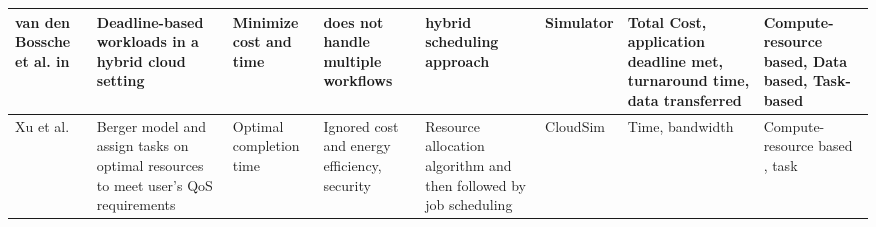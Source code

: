 \begin{table*}[!htbp]
{\begin{tabular}{|p{1.9cm} p{2cm} p{2cm} p{2cm} p{2cm} p{2cm} p{2cm} p{2cm}|}
van den Bossche et al. in~\cite{vandenbosshe2013} & Deadline-based workloads in a hybrid cloud setting & Minimize cost and time & does not handle multiple workflows & hybrid scheduling approach & Simulator & Total Cost, application deadline met, turnaround time, data transferred & Compute-resource based, Data based, Task-based
\\ \hline

Xu et al.~\cite{xu2011job} & Berger model and assign tasks on optimal resources to meet user's QoS requirements & Optimal completion time & Ignored cost and energy efficiency, security& Resource allocation algorithm and then followed by job scheduling & CloudSim & Time, bandwidth & Compute-resource based , task
\\ \hline


\end{tabular}
}
\end{table*}